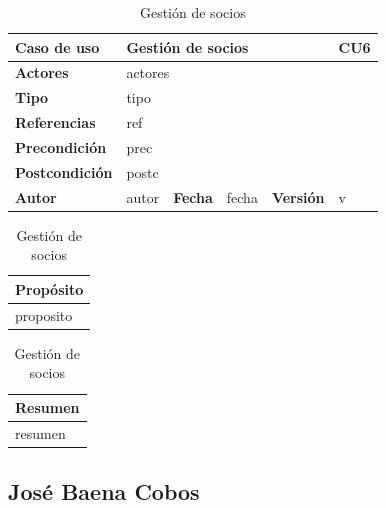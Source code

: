 \documentclass[12pt,spanish]{article}
\begin{document}
\begin{table}[H]
\centering
\begin{tabular}{|m{3cm}|m{4cm}|m{2cm}|m{2cm}|m{2cm}|m{1cm}|}
\hline
\textbf{Caso de uso} &  \multicolumn{4}{m{8cm}|}{Gestión de socios} \vline &  \cellcolor{gray!40}CU6 \\
\hline
\textbf{Actores} & \multicolumn{5}{m{8cm}|}{actores} \\
\hline
\textbf{Tipo} & \multicolumn{5}{m{8cm}|}{tipo} \\
\hline
\textbf{Referencias} &\multicolumn{5}{m{8cm}|}{ref} \\
\hline
\textbf{Precondición} & \multicolumn{5}{m{8cm}|}{prec} \\
\hline
\textbf{Postcondición} & \multicolumn{5}{m{8cm}|}{postc} \\
\hline
\textbf{Autor} & autor & \textbf{Fecha} & fecha & \textbf{Versión} & v \\
\hline
\end{tabular}

\vspace{1cm}

\begin{tabular}{|m{16.2cm}|}
\hline
\textbf{Propósito} \\
\hline
proposito \\
\hline
\end{tabular}

\vspace{1cm}

\begin{tabular}{|m{16.2cm}|}
\hline
\textbf{Resumen} \\
\hline
resumen \\
\hline
\end{tabular}

\caption{Gestión de socios}
\label{cu:6}
\end{table}



\subsection{José Baena Cobos}

\end{document}
